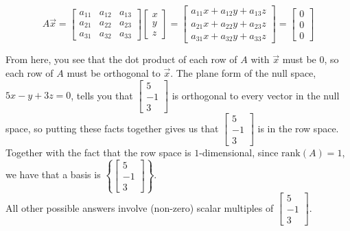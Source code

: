 \documentclass[11pt]{article}
\begin{document}
\begin{prob}[(16 pts)]
\begin{subprob}
\begin{solution}
$$A \vec x = \begin{bmatrix} a_{11} & a_{12} & a_{13} \\ a_{21} & a_{22} & a_{23} \\ a_{31} & a_{32} & a_{33} \end{bmatrix} \begin{bmatrix} x \\ y \\ z \end{bmatrix} = \begin{bmatrix} a_{11}x + a_{12}y + a_{13}z \\ a_{21}x + a_{22}y + a_{23}z \\ a_{31}x + a_{32}y + a_{33}z \end{bmatrix} = \begin{bmatrix} 0 \\ 0 \\ 0 \end{bmatrix}$$

From here, you see that the dot product of each row of $A$ with $\vec x$ must be 0, so each row of $A$ must be orthogonal to $\vec x$. The plane form of the null space, $5x-y+3z=0$, tells you that $\begin{bmatrix} 5 \\ -1 \\ 3 \end{bmatrix}$ is orthogonal to every vector in the null space, so putting these facts together gives us that $\begin{bmatrix} 5 \\ -1 \\ 3 \end{bmatrix}$ is in the row space. Together with the fact that the row space is $1$-dimensional, since $\text{rank}(A)=1$, we have that a basis is $\left\{ \begin{bmatrix} 5 \\ -1 \\ 3 \end{bmatrix} \right\}$. \\

All other possible answers involve (non-zero) scalar multiples of $\begin{bmatrix} 5 \\ -1 \\ 3 \end{bmatrix}$.


\end{solution}
\end{subprob}


\end{prob}
\end{document}

